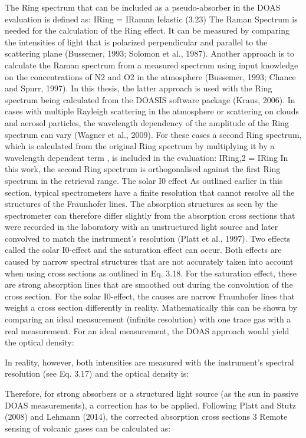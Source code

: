 \documentclass  [
  paper    = a4,
  BCOR     = 10mm,
  twoside,
  fontsize = 12pt,
  fleqn,
  toc      = bibnumbered,
  toc      = listofnumbered,
  numbers  = noendperiod,
  headings = normal,
  listof   = leveldown,
  version  = 3.03
]                                       {scrreprt}
\begin{document}
	The Ring spectrum that can be included as a pseudo-absorber in the DOAS
	evaluation is defined as:
	IRing = IRaman
	Ielastic
	(3.23)
	The Raman Spectrum is needed for the calculation of the Ring effect. It can be
	measured by comparing the intensities of light that is polarized perpendicular
	and parallel to the scattering plane (Bussemer, 1993; Solomon et al., 1987). Another
	approach is to calculate the Raman spectrum from a measured spectrum
	using input knowledge on the concentrations of N2 and O2 in the atmosphere (Bussemer, 1993; Chance and Spurr, 1997). In this thesis, the latter approach
	is used with the Ring spectrum being calculated from the DOASIS software
	package (Kraus, 2006).
	In cases with multiple Rayleigh scattering in the atmosphere or scattering on
	clouds and aerosol particles, the wavelength dependency of the amplitude of the
	Ring spectrum can vary (Wagner et al., 2009). For these cases a second Ring
	spectrum, which is calculated from the original Ring spectrum by multiplying it
	by a wavelength dependent term , is included in the evaluation:
	IRing,2 = IRing 
	In this work, the second Ring spectrum is orthogonalised against the first Ring
	spectrum in the retrieval range.
	The solar I0 effect
	As outlined earlier in this section, typical spectrometers have a finite resolution
	that cannot resolve all the structures of the Fraunhofer lines. The absorption
	structures as seen by the spectrometer can therefore differ slightly from the absorption
	cross sections that were recorded in the laboratory with an unstructured
	light source and later convolved to match the instrument’s resolution (Platt
	et al., 1997). Two effects called the solar I0-effect and the saturation effect
	can occur. Both effects are caused by narrow spectral structures that are not
	accurately taken into account when using cross sections as outlined in Eq. 3.18.
	For the saturation effect, these are strong absorption lines that are smoothed out
	during the convolution of the cross section. For the solar I0-effect, the causes
	are narrow Fraunhofer lines that weight a cross section differently in reality.
	Mathematically this can be shown by comparing an ideal measurement (infinite
	resolution) with one trace gas with a real measurement. For an ideal measurement,
	the DOAS approach would yield the optical density:

	In reality, however, both intensities are measured with the instrument’s spectral
	resolution (see Eq. 3.17) and the optical density  is:

	Therefore, for strong absorbers or a structured light source (as the sun in
	passive DOAS measurements), a correction has to be applied. Following Platt
	and Stutz (2008) and Lehmann (2014), the corrected absorption cross sections 3 Remote sensing of volcanic gases
	can be calculated as:
\end{document}
